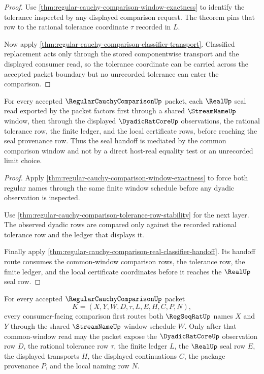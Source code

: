 \begin{proof}
Use \autoref{thm:regular-cauchy-comparison-window-exactness} to identify the tolerance inspected by any displayed comparison request. The theorem pins that row to the rational tolerance coordinate $\tau$ recorded in $L$.

Now apply \autoref{thm:regular-cauchy-comparison-classifier-transport}. Classified replacement acts only through the stored componentwise transport and the displayed consumer read, so the tolerance coordinate can be carried across the accepted packet boundary but no unrecorded tolerance can enter the comparison.
\end{proof}

\begin{theorem}
\label{thm:regular-cauchy-comparison-common-window-seal-factorization}
For every accepted $\RegularCauchyComparisonUp$ packet, each $\RealUp$ seal read exported by the packet factors first through a shared $\StreamNameUp$ window, then through the displayed $\DyadicRatCoreUp$ observations, the rational tolerance row, the finite ledger, and the local certificate rows, before reaching the seal provenance row. Thus the seal handoff is mediated by the common comparison window and not by a direct host-real equality test or an unrecorded limit choice.
\end{theorem}

\begin{proof}
Apply \autoref{thm:regular-cauchy-comparison-window-exactness} to force both regular names through the same finite window schedule before any dyadic observation is inspected.

Use \autoref{thm:regular-cauchy-comparison-tolerance-row-stability} for the next layer. The observed dyadic rows are compared only against the recorded rational tolerance row and the ledger that displays it.

Finally apply \autoref{thm:regular-cauchy-comparison-real-classifier-handoff}. Its handoff route consumes the common-window comparison rows, the tolerance row, the finite ledger, and the local certificate coordinates before it reaches the $\RealUp$ seal row.
\end{proof}

\begin{theorem}
\label{thm:regular-cauchy-comparison-two-stage-handoff}
For every accepted $\RegularCauchyComparisonUp$ packet
$$
K=(X,Y,W,D,\tau,L,E,H,C,P,N),
$$
every consumer-facing comparison first routes both $\RegSeqRatUp$ names $X$ and $Y$ through the shared $\StreamNameUp$ window schedule $W$. Only after that common-window read may the packet expose the $\DyadicRatCoreUp$ observation row $D$, the rational tolerance row $\tau$, the finite ledger $L$, the $\RealUp$ seal row $E$, the displayed transports $H$, the displayed continuations $C$, the package provenance $P$, and the local naming row $N$.
\end{theorem}

